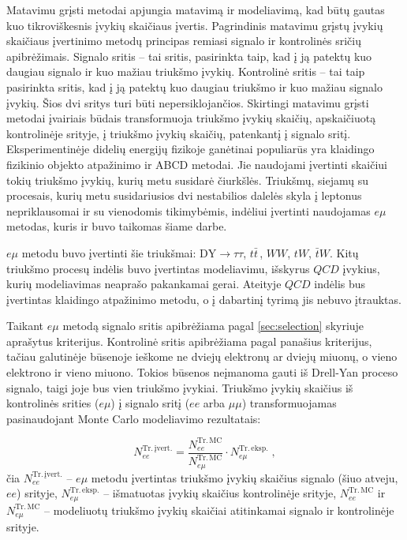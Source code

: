 \documentclass[a4paper, 12pt, twoside]{article}
\newcommand{\emu}{e\mu}
\newcommand{\DYtau}{\mathrm{DY} \! \rightarrow \! \tau\tau}
\newlength\q
\begin{document}
Matavimu grįsti metodai apjungia matavimą ir modeliavimą, kad būtų gautas kuo tikroviškesnis įvykių skaičiaus įvertis.
Pagrindinis matavimu grįstų įvykių skaičiaus įvertinimo metodų principas remiasi signalo ir kontrolinės sričių apibrėžimais.
Signalo sritis -- tai sritis, pasirinkta taip, kad į ją patektų kuo daugiau signalo ir kuo mažiau triukšmo įvykių.
Kontrolinė sritis -- tai taip pasirinkta sritis, kad į ją patektų kuo daugiau triukšmo ir kuo mažiau signalo įvykių.
Šios dvi sritys turi būti nepersiklojančios.
Skirtingi matavimu grįsti metodai įvairiais būdais transformuoja triukšmo įvykių skaičių, apskaičiuotą kontrolinėje
srityje, į triukšmo įvykių skaičių, patenkantį į signalo sritį.
Eksperimentinėje didelių energijų fizikoje ganėtinai populiarūs yra klaidingo fizikinio objekto atpažinimo ir ABCD metodai.
Jie naudojami įvertinti skaičiui tokių triukšmo įvykių, kurių metu susidarė čiurkšlės.
Triukšmų, siejamų su procesais, kurių metu susidariusios dvi nestabilios dalelės skyla į leptonus nepriklausomai ir su
vienodomis tikimybėmis, indėliui įvertinti naudojamas $\emu$ metodas, kuris ir buvo taikomas šiame darbe.

$\emu$ metodu buvo įvertinti šie triukšmai: $\DYtau$, $t\bar{t}\,$, $WW$, $tW$, $\bar{t}W$.
Kitų triukšmo procesų indėlis buvo įvertintas modeliavimu, išskyrus $QCD$ įvykius, kurių modeliavimas neaprašo pakankamai
gerai.
Ateityje $QCD$ indėlis bus įvertintas klaidingo atpažinimo metodu, o į dabartinį tyrimą jis nebuvo įtrauktas.

Taikant $\emu$ metodą signalo sritis apibrėžiama pagal \ref{sec:selection} skyriuje aprašytus kriterijus.
Kontrolinė sritis apibrėžiama pagal panašius kriterijus, tačiau galutinėje būsenoje ieškome
ne dviejų elektronų ar dviejų miuonų, o vieno elektrono ir vieno miuono.
Tokios būsenos neįmanoma gauti iš Drell-Yan proceso signalo, taigi joje bus vien triukšmo įvykiai.
Triukšmo įvykių skaičius iš kontrolinės srities ($\emu$) į signalo sritį ($ee$ arba $\mu\mu$)
transformuojamas pasinaudojant Monte Carlo modeliavimo rezultatais:

\begin{equation}
	N_{ee}^{\mathrm{Tr. \, įvert.}} =
	\frac{ N_{ee}^{\mathrm{Tr. \, MC}} }{ N_{e\mu}^{\mathrm{Tr. \, MC}} }
	\cdot N_{e\mu}^{\mathrm{Tr. \, eksp.}} \; ,
	\label{eq:emuMethod}
\end{equation}
čia $N_{ee}^{\mathrm{Tr. \, įvert.}}$ -- $\emu$ metodu įvertintas triukšmo įvykių skaičius signalo
(šiuo atveju, $ee$) srityje, $N_{e\mu}^{\mathrm{Tr. \, eksp.}}$ -- išmatuotas įvykių skaičius
kontrolinėje srityje, $N_{ee}^{\mathrm{Tr. \, MC}}$ ir $N_{e\mu}^{\mathrm{Tr. \, MC}}$ -- modeliuotų
triukšmo įvykių skaičiai atitinkamai signalo ir kontrolinėje srityje.
\end{document}
